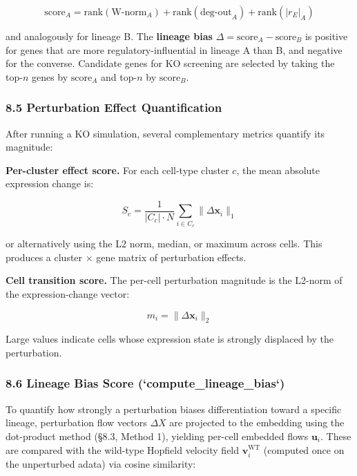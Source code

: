 \documentclass[11pt]{article}
\begin{document}
\begin{equation}
\text{score}_A = \mathrm{rank}(\text{W-norm}_A) + \mathrm{rank}(\text{deg-out}_A) + \mathrm{rank}(|r_E|_A)
\end{equation}

and analogously for lineage B. The \textbf{lineage bias} $\Delta = \text{score}_A - \text{score}_B$ is positive for genes that are more regulatory-influential in lineage A than B, and negative for the converse. Candidate genes for KO screening are selected by taking the top-$n$ genes by $\text{score}_A$ and top-$n$ by $\text{score}_B$.


\subsubsection*{8.5 Perturbation Effect Quantification}

After running a KO simulation, several complementary metrics quantify its magnitude:

\textbf{Per-cluster effect score.} For each cell-type cluster $c$, the mean absolute expression change is:

\begin{equation}
S_c = \frac{1}{|C_c| \cdot N} \sum_{i \in C_c} \|\Delta\mathbf{x}_i\|_1
\end{equation}

or alternatively using the L2 norm, median, or maximum across cells. This produces a cluster $\times$ gene matrix of perturbation effects.

\textbf{Cell transition score.} The per-cell perturbation magnitude is the L2-norm of the expression-change vector:

\begin{equation}
m_i = \|\Delta\mathbf{x}_i\|_2
\end{equation}

Large values indicate cells whose expression state is strongly displaced by the perturbation.


\subsubsection*{8.6 Lineage Bias Score (`compute\_lineage\_bias`)}

To quantify how strongly a perturbation biases differentiation toward a specific lineage, perturbation flow vectors $\Delta X$ are projected to the embedding using the dot-product method (§8.3, Method 1), yielding per-cell embedded flows $\mathbf{u}_i$. These are compared with the wild-type Hopfield velocity field $\mathbf{v}_i^{\mathrm{WT}}$ (computed once on the unperturbed adata) via cosine similarity:
\end{document}

